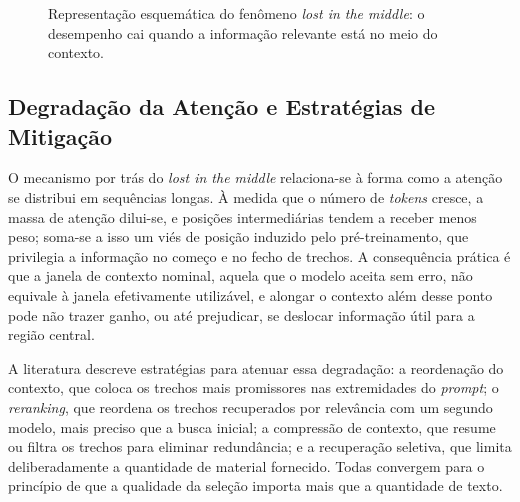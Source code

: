 \begin{figure}[htb]
\centering
{}
\caption[Representação esquemática do fenômeno \textit{lost in the middle}]{Representação esquemática do fenômeno \textit{lost in the middle}: o desempenho cai quando a informação relevante está no meio do contexto.}
\label{fig:lost-middle}
\par{}
\end{figure}

\subsection{Degradação da Atenção e Estratégias de Mitigação}\label{sec:degradacao-atencao}

O mecanismo por trás do \textit{lost in the middle} relaciona-se à forma como a atenção se distribui em sequências longas. À medida que o número de \textit{tokens} cresce, a massa de atenção dilui-se, e posições intermediárias tendem a receber menos peso; soma-se a isso um viés de posição induzido pelo pré-treinamento, que privilegia a informação no começo e no fecho de trechos. A consequência prática é que a janela de contexto nominal, aquela que o modelo aceita sem erro, não equivale à janela efetivamente utilizável, e alongar o contexto além desse ponto pode não trazer ganho, ou até prejudicar, se deslocar informação útil para a região central.

A literatura descreve estratégias para atenuar essa degradação: a reordenação do contexto, que coloca os trechos mais promissores nas extremidades do \textit{prompt}; o \textit{reranking}, que reordena os trechos recuperados por relevância com um segundo modelo, mais preciso que a busca inicial; a compressão de contexto, que resume ou filtra os trechos para eliminar redundância; e a recuperação seletiva, que limita deliberadamente a quantidade de material fornecido. Todas convergem para o princípio de que a qualidade da seleção importa mais que a quantidade de texto.

